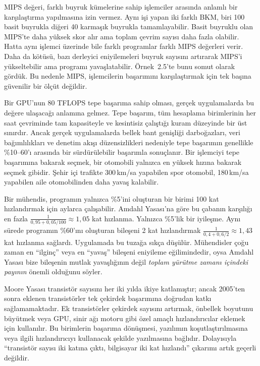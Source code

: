 MIPS değeri, farklı buyruk kümelerine sahip işlemciler arasında anlamlı bir karşılaştırma yapılmasına izin vermez. Aynı işi yapan iki farklı BKM, biri 100 basit buyrukla diğeri 40 karmaşık buyrukla tamamlayabilir. Basit buyruklu olan MIPS'te daha yüksek skor alır ama toplam çevrim sayısı daha fazla olabilir. Hatta aynı işlemci üzerinde bile farklı programlar farklı MIPS değerleri verir. Daha da kötüsü, bazı derleyici eniyilemeleri buyruk sayısını artırarak MIPS'i yükseltebilir ama programı yavaşlatabilir. Örnek~2.5'te bunu somut olarak gördük. Bu nedenle MIPS, işlemcilerin başarımını karşılaştırmak için tek başına güvenilir bir ölçüt değildir.

Bir GPU'nun 80 TFLOPS tepe başarıma sahip olması, gerçek uygulamalarda bu değere ulaşacağı anlamına gelmez. Tepe başarım, tüm hesaplama birimlerinin her saat çevriminde tam kapasiteyle ve kesintisiz çalıştığı kuram düzeyinde bir üst sınırdır. Ancak gerçek uygulamalarda bellek bant genişliği darboğazları, veri bağımlılıkları ve denetim akışı düzensizlikleri nedeniyle tepe başarımın genellikle \%10--60'ı arasında bir sürdürülebilir başarımla sonuçlanır. Bir işlemciyi tepe başarımına bakarak seçmek, bir otomobili yalnızca en yüksek hızına bakarak seçmek gibidir. Şehir içi trafikte 300\,km/sa yapabilen spor otomobil, 180\,km/sa yapabilen aile otomobilinden daha yavaş kalabilir.

Bir mühendis, programın yalnızca \%5'ini oluşturan bir birimi 100 kat hızlandırmak için aylarca çalışabilir. Amdahl Yasası'na göre bu çabanın karşılığı en fazla $\frac{1}{0{,}95 + 0{,}05/100} \approx 1{,}05$ kat hızlanma. Yalnızca \%5'lik bir iyileşme. Aynı sürede programın \%60'ını oluşturan bileşeni 2 kat hızlandırmak $\frac{1}{0{,}4 + 0{,}6/2} \approx 1{,}43$ kat hızlanma sağlardı. Uygulamada bu tuzağa sıkça düşülür. Mühendisler çoğu zaman en ``ilginç'' veya en ``yavaş'' bileşeni eniyileme eğilimindedir, oysa Amdahl Yasası bize bileşenin mutlak yavaşlığının değil \emph{toplam yürütme zamanı içindeki payının} önemli olduğunu söyler.

Moore Yasası transistör sayısını her iki yılda ikiye katlamıştır; ancak 2005'ten sonra eklenen transistörler tek çekirdek başarımına doğrudan katkı sağlamamaktadır. Ek transistörler çekirdek sayısını artırmak, önbellek boyutunu büyütmek veya GPU, sinir ağı motoru gibi özel amaçlı hızlandırıcılar eklemek için kullanılır. Bu birimlerin başarıma dönüşmesi, yazılımın koşutlaştırılmasına veya ilgili hızlandırıcıyı kullanacak şekilde yazılmasına bağlıdır. Dolayısıyla ``transistör sayısı iki katına çıktı, bilgisayar iki kat hızlandı'' çıkarımı artık geçerli değildir.

